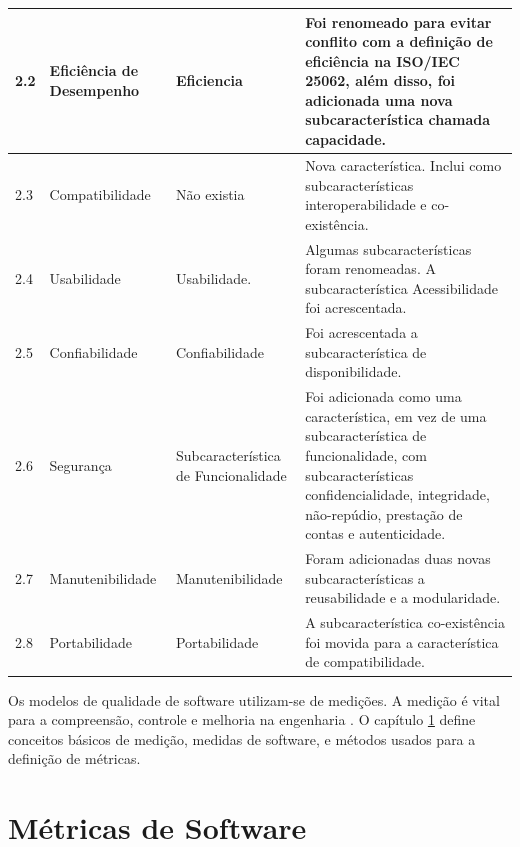 \begin{longtable}{|p{12pt}|p{103pt}|p{135pt}|p{175pt}|}
 	\hline
 	{\raggedright 2.2}
 	 & {\raggedright Eficiência de Desempenho}
 	 & {\raggedright Eficiencia}
 	 & {\raggedright Foi renomeado para evitar conflito com a definição de eficiência na ISO/IEC 25062, além disso, foi adicionada uma nova subcaracterística chamada capacidade.} \\
 	\hline
 	{\raggedright 2.3}
 	 & {\raggedright Compatibilidade}
 	 & {\raggedright Não existia}
 	 & {\raggedright  Nova característica. Inclui como subcaracterísticas interoperabilidade e co-existência.} \\
 	\hline
 	{\raggedright 2.4}
 	 & {\raggedright Usabilidade}
 	 & {\raggedright Usabilidade.}
 	 & {\raggedright Algumas subcaracterísticas foram renomeadas. A subcaracterística Acessibilidade foi acrescentada.} \\
 	\hline
 	{\raggedright 2.5}
 	 & {\raggedright Confiabilidade}
 	 & {\raggedright Confiabilidade}
 	 & {\raggedright Foi acrescentada a subcaracterística de disponibilidade.} \\
 	\hline
 	{\raggedright 2.6}
 	 	 & {\raggedright Segurança}
 	 	 & {\raggedright Subcaracterística de Funcionalidade}
 	 	 & {\raggedright Foi adicionada como uma característica, em vez de uma subcaracterística de funcionalidade, com subcaracterísticas confidencialidade, integridade, não-repúdio, prestação de contas e autenticidade.} \\
 	 	\hline
 	 {\raggedright 2.7}
 	  	 & {\raggedright Manutenibilidade}
 	  	 & {\raggedright Manutenibilidade}
 	  	 & {\raggedright Foram adicionadas duas novas subcaracterísticas a reusabilidade e a modularidade.} \\
 	  	\hline
 	  	{\raggedright 2.8}
 	  	 	 & {\raggedright Portabilidade}
 	  	 	 & {\raggedright Portabilidade}
 	  	 	 & {\raggedright A subcaracterística co-existência foi movida para a característica de compatibilidade.} \\
 	  	 	\hline
 	\end{longtable}
 

Os modelos de qualidade de software utilizam-se de medições. A medição é vital para a compreensão, controle e melhoria na engenharia \cite{tarhan}.  O capítulo \ref{metrics} define conceitos básicos de medição, medidas de software, e métodos usados para a definição de métricas.




\chapter[Métricas de Software]{Métricas de Software}
\label{metrics}

